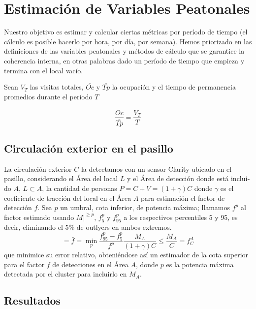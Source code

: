 \section{Estimación de Variables Peatonales}

Nuestro objetivo es estimar y calcular ciertas métricas por período de tiempo
(el cálculo es posible hacerlo por hora, por día, por semana).
Hemos priorizado en las definiciones de las variables peatonales 
y métodos de cálculo que se garantice la coherencia interna, en otras palabras
dado un período de tiempo que empieza y termina con el local vacío.


Sean $V_T$ las visitas totales, $\overline{Oc}$ y $\overline{Tp}$ 
la ocupación y el tiempo de permanencia promedios durante el período $T$

\begin{equation} 
   \frac{\overline{Oc}}{\overline{Tp}} = \frac{V_T}{T}
   \label{eq:OcTpVT}
\end{equation}

\subsection{Circulación exterior en el pasillo}
La circulación exterior $C$ la detectamos con un sensor Clarity ubicado en el pasillo,
considerando el Área del local $L$ y el Área de detección donde está incluí­do $A$, $L \subset A$,
la cantidad de personas $P = C + V = (1 + \gamma)C$ donde $\gamma$ es el coeficiente de tracción del local
en el Área $A$ para estimación el factor de detección $f$.
Sea $p$ un umbral, cota inferior, de potencia máxima; llamamos $f^p$ al factor estimado usando $M\big|^{\ge p}$,
$f_{5}^p$ y $f_{95}^p$ a los respectivos percentiles 5 y 95,
es decir, eliminando el 5\% de outlyers en ambos extremos.
\[
= \bar{f} = \min_p \frac{f_{95}^p - f_5^p}{f^p}
\frac{M_A}{(1 + \gamma)C} 
\le \frac{M_A}{C} = f^A_C 
\]
que minimice su error relativo, obteniéndose así un
estimador de la cota superior para el factor $f$ de detecciones en el Área $A$,
donde $p$ es la potencia máxima detectada por el cluster para incluirlo en $M_A$. 

\subsection{Resultados}

